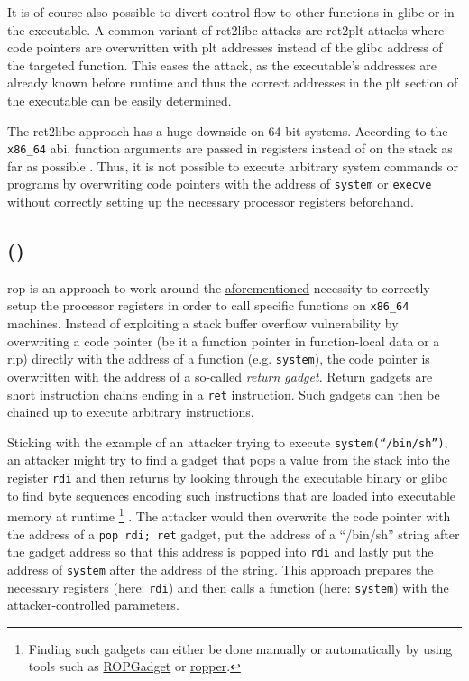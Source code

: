 It is of course also possible to divert control flow to other functions in \gls{glibc} or in the executable.
A common variant of \gls{ret2libc} attacks are \gls{ret2plt} attacks where code pointers are overwritten with \gls{plt} addresses instead of the \gls{glibc} address of the targeted function.
This eases the attack, as the executable's addresses are already known before runtime and thus the correct addresses in the \gls{plt} section of the executable can be easily determined.

The \gls{ret2libc} approach has a huge downside on 64 bit systems.
According to the \texttt{x86\_64} \gls{abi}, function arguments are passed in registers instead of on the stack as far as possible \cites[19\psqq]{Lu2018}[17\psqq]{Fog2019}.
Thus, it is not possible to execute arbitrary system commands or programs by overwriting code pointers with the address of \texttt{system} or \texttt{execve} without correctly setting up the necessary processor registers beforehand.


\subsection{ ()}
\label{subsec:cr-rop}

\gls{rop} is an approach to work around the \hyperref[subsec:cr-ret2libc]{aforementioned} necessity to correctly setup the processor registers in order to call specific functions on \texttt{x86\_64} machines.
Instead of exploiting a stack buffer overflow vulnerability by overwriting a code pointer (be it a function pointer in function-local data or a \gls{rip}) directly with the address of a function (e.g. \texttt{system}), the code pointer is overwritten with the address of a so-called \emph{return gadget}.
Return gadgets are short instruction chains ending in a \texttt{ret} instruction.
Such gadgets can then be chained up to execute arbitrary instructions.

Sticking with the example of an attacker trying to execute \texttt{system(``/bin/sh'')}, an attacker might try to find a gadget that pops a value from the stack into the register \texttt{rdi} and then returns by looking through the executable binary or \gls{glibc} to find byte sequences encoding such instructions that are loaded into executable memory at runtime%
	\footnote{Finding such gadgets can either be done manually or automatically by using tools such as \href{https://github.com/JonathanSalwan/ROPgadget}{ROPGadget} or \href{https://github.com/sashs/Ropper}{ropper}.}%
.
The attacker would then overwrite the code pointer with the address of a \texttt{pop rdi; ret} gadget, put the address of a ``/bin/sh'' string after the gadget address so that this address is popped into \texttt{rdi} and lastly put the address of \texttt{system} after the address of the string.
This approach prepares the necessary registers (here: \texttt{rdi}) and then calls a function (here: \texttt{system}) with the attacker-controlled parameters.

